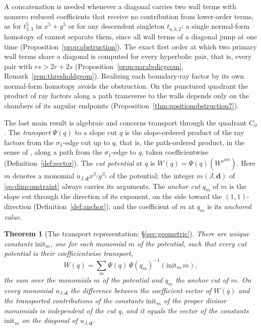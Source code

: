 \documentclass[11pt]{amsart}
\newtheorem{theorem}{Theorem}[section]
\theoremstyle{definition}
\theoremstyle{remark}
\begin{document}
A concatenation is needed whenever a diagonal carries two wall terms with
nonzero reduced coefficients that receive no contribution from lower-order
terms, as for
$t_{3,3}^5$ in $x^5+y^5$ or for any descendent singleton $t_{a,b,2}$: a single
normal-form homotopy of \cite[Lem.~3.40]{GKT} cannot separate them, since all
wall terms of a diagonal jump at one time (Proposition~\ref{prop:obstruction}).
The exact first order at which two primary wall terms share a diagonal is
computed for every hyperbolic pair, that is, every pair with $rs>2r+2s$
(Proposition~\ref{prop:parabolicgeom},
Remark~\ref{rem:thresholdgeom}).  Realizing each boundary-ray factor by its
own normal-form homotopy avoids the obstruction.  On the punctured quadrant the
product of ray factors along a path transverse to the walls depends only on
the chambers of its angular endpoints
(Proposition~\ref{thm:positionobstruction7}).

The last main result is algebraic and concerns transport through the
quadrant $C_\partial$.  The \emph{transport}
$\Psi(q)$ to a slope cut $q$ is the slope-ordered product of the ray factors
from the $\sigma_1$-edge cut up to $q$, that is, the path-ordered product, in
the sense of \cite{GPS10}, along a path from the $\sigma_1$-edge to $q$, taken
coefficientwise (Definition~\ref{def:sector}).  The \emph{cut potential} at
$q$ is $W(q)=\Psi(q)(W^{\nu^{\min}})$.  Here $m$ denotes a monomial
$u_{J,\mathbf d}x^{\beta_1}y^{\beta_2}$ of the potential; the integer
$m(J,\mathbf d)$ of \eqref{eq:dimconstraint} always carries its arguments.
The \emph{anchor cut} $q_m$ of $m$ is the slope cut through the direction of
its exponent, on the side toward the $(1,1)$-direction
(Definition~\ref{def:anchor}), and the coefficient of $m$ at $q_m$ is its
\emph{anchored value}.

\begin{theorem}[The transport representation; \S\ref{sec:geometric}]
\label{thm:transport}
There are unique constants $\mathrm{init}_m$, one for each monomial $m$ of the
potential, such that every cut potential is their coefficientwise transport,
\[
W(q)=\sum_{m}\Psi(q)\,\Psi(q_{m})^{-1}(\mathrm{init}_{m}\,m),
\]
the sum over the monomials $m$ of the potential and $q_{m}$ the anchor cut
of $m$.  On every monomial $u_{J,\mathbf d}$ the difference between the
coefficient vector of $W(q)$ and the transported contributions of the
constants $\mathrm{init}_m$ of the proper divisor monomials is
\emph{independent of the cut} $q$, and it equals the vector of the constants
$\mathrm{init}_m$ on the diagonal of $u_{J,\mathbf d}$.
\end{theorem}
\end{document}
